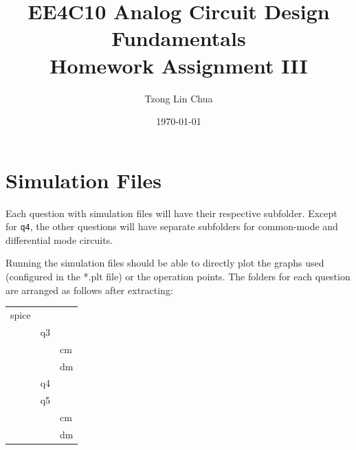 \documentclass{article}
\author{Tzong Lin Chua}
\date{\today}
\title{EE4C10 Analog Circuit Design Fundamentals\\\medskip
\large Homework Assignment III }
\begin{document}
\maketitle
\tableofcontents


\section{Simulation Files}
\label{sec:org6d3b08f}
Each question with simulation files will have their respective subfolder.
Except for \texttt{q4}, the other questions will have separate subfolders for common-mode and differential mode circuits.

Running the simulation files should be able to directly plot the graphs used (configured in the *.plt file) or the operation points.
The folders for each question are arranged as follows after extracting:

\begin{center}
\begin{tabular}{lll}
\hline
spice &  & \\
 & q3 & \\
 &  & cm\\
 &  & dm\\
 & q4 & \\
 & q5 & \\
 &  & cm\\
 &  & dm\\
\hline
\end{tabular}
\end{center}
\end{document}
